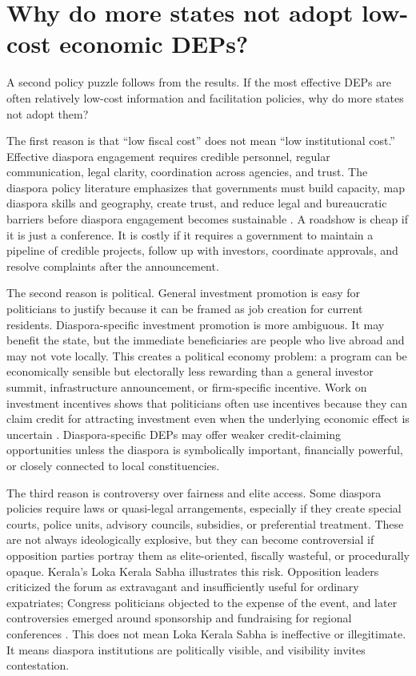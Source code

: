 \documentclass[doublespace,nopageskip]{UVAthesis}
\begin{document}
\section{Why do more states not adopt low-cost economic DEPs?}

A second policy puzzle follows from the results. If the most effective DEPs are often relatively low-cost information and facilitation policies, why do more states not adopt them?

The first reason is that ``low fiscal cost'' does not mean ``low institutional cost.'' Effective diaspora engagement requires credible personnel, regular communication, legal clarity, coordination across agencies, and trust. The diaspora policy literature emphasizes that governments must build capacity, map diaspora skills and geography, create trust, and reduce legal and bureaucratic barriers before diaspora engagement becomes sustainable \citep{newland_developing_2012, ionescu_engaging_2006}. A roadshow is cheap if it is just a conference. It is costly if it requires a government to maintain a pipeline of credible projects, follow up with investors, coordinate approvals, and resolve complaints after the announcement.

The second reason is political. General investment promotion is easy for politicians to justify because it can be framed as job creation for current residents. Diaspora-specific investment promotion is more ambiguous. It may benefit the state, but the immediate beneficiaries are people who live abroad and may not vote locally. This creates a political economy problem: a program can be economically sensible but electorally less rewarding than a general investor summit, infrastructure announcement, or firm-specific incentive. Work on investment incentives shows that politicians often use incentives because they can claim credit for attracting investment even when the underlying economic effect is uncertain \citep{jensen_pass_2014, jensen_incentives_2018}. Diaspora-specific DEPs may offer weaker credit-claiming opportunities unless the diaspora is symbolically important, financially powerful, or closely connected to local constituencies.

The third reason is controversy over fairness and elite access. Some diaspora policies require laws or quasi-legal arrangements, especially if they create special courts, police units, advisory councils, subsidies, or preferential treatment. These are not always ideologically explosive, but they can become controversial if opposition parties portray them as elite-oriented, fiscally wasteful, or procedurally opaque. Kerala's Loka Kerala Sabha illustrates this risk. Opposition leaders criticized the forum as extravagant and insufficiently useful for ordinary expatriates; Congress politicians objected to the expense of the event, and later controversies emerged around sponsorship and fundraising for regional conferences \citep{tnn_cut_2022, express_news_services_udf_2023}. This does not mean Loka Kerala Sabha is ineffective or illegitimate. It means diaspora institutions are politically visible, and visibility invites contestation.
\end{document}
